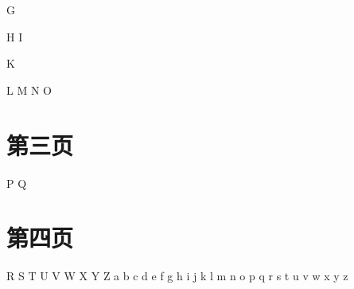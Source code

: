 \documentclass[twoside]{article}
\begin{document}
    \newcommand{\bfit}[1]{\textbf{\textit{#1}}}
    G

    H
    I

    K %

    L
    M
    N
    O

\newpage

\section{第三页}
    P
    Q

\newpage

\section{第四页}
    R
    S
    T
    U
    V
    W
    X
    Y
    Z
    a
    b
    c
    d
    e
    f
    g
    h
    i
    j
    k
    l
    m
    n
    o
    p
    q
    r
    s
    t
    u
    v
    w
    x
    y
    z


\printindex
\printindex[g1]
\printindex[g2]
\end{document}
